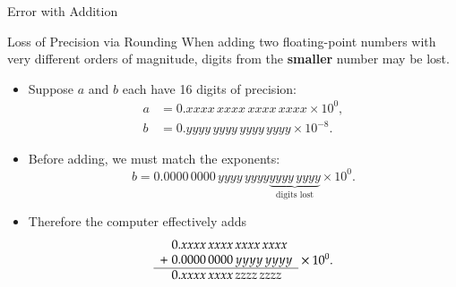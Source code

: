 \documentclass[10pt]{beamer}
\begin{document}
\begin{frame}{Error with Addition}

\begin{block}{Loss of Precision via Rounding}
When adding two floating-point numbers with very different
orders of magnitude, digits from the \textbf{smaller} number may be lost.
\end{block}

\begin{itemize}
    \item Suppose $a$ and $b$ each have 16 digits of precision:
    \begin{align*}
        a &= 0.xxxx\,xxxx\,xxxx\,xxxx \times 10^0,\\
        b &= 0.yyyy\,yyyy\,yyyy\,yyyy \times 10^{-8}.
    \end{align*}

    \item Before adding, we must match the exponents:
    \[
        b
        =
        0.0000\,0000\,yyyy\,yyyy
        \underbrace{yyyy\,yyyy}_{\text{digits lost}}
        \times 10^0.
    \]

    \item Therefore the computer effectively adds
    \[
    \begin{array}{r@{\;}l}
          &0.xxxx\,xxxx\,xxxx\,xxxx\\
        + &0.0000\,0000\,yyyy\,yyyy\\
        \hline
          &0.xxxx\,xxxx\,zzzz\,zzzz
    \end{array}
    \times 10^0.
    \]
\end{itemize}


\end{frame}
\end{document}
